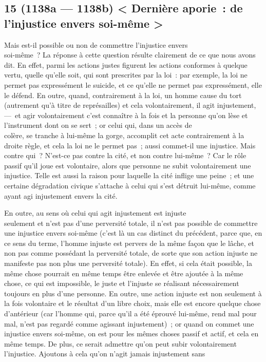 \documentclass[french,twoside]{book} %
\begin{document}
\subsection[{15 (1138a — 1138b) < Dernière aporie : de l’injustice envers soi-même >}]{15 (1138a — 1138b) < Dernière aporie : de l’injustice envers soi-même >}
\noindent Mais est-il possible ou non de commettre l’injustice envers \\
soi-même ? La réponse à cette question résulte clairement de ce que nous avons dit. En effet, parmi les actions justes figurent les actions conformes à quelque vertu, quelle qu’elle soit, qui sont prescrites par la loi : par exemple, la loi ne permet pas expressément le suicide, et ce qu’elle ne permet pas expressément, elle le défend. En outre, quand, contrairement à la loi, un homme cause du tort (autrement qu’à titre de représailles) et cela volontairement, il agit injustement, — et agir volontairement c’est connaître à la fois et la personne qu’on lèse et l’instrument dont on se sert ; or celui qui, dans un accès de \\
colère, se tranche à lui-même la gorge, accomplit cet acte contrairement à la droite règle, et cela la loi ne le permet pas ; aussi commet-il une injustice. Mais contre qui ? N’est-ce pas contre la cité, et non contre lui-même ? Car le rôle passif qu’il joue est volontaire, alors que personne ne subit volontairement une injustice. Telle est aussi la raison pour laquelle la cité inflige une peine ; et une certaine dégradation civique s’attache à celui qui s’est détruit lui-même, comme ayant agi injustement envers la cité.\par
En outre, au sens où celui qui agit injustement est injuste \\
seulement et n’est pas d’une perversité totale, il n’est pas possible de commettre une injustice envers soi-même (c’est là un cas distinct du précédent, parce que, en ce sens du terme, l’homme injuste est pervers de la même façon que le lâche, et non pas comme possédant la perversité totale, de sorte que son action injuste ne manifeste pas non plus une perversité totale). En effet, si cela était possible, la même chose pourrait en même temps être enlevée et être ajoutée à la même chose, ce qui est impossible, le juste et l’injuste se réalisant nécessairement \\
toujours en plus d’une personne. En outre, une action injuste est non seulement à la fois volontaire et le résultat d’un libre choix, mais elle est encore quelque chose d’antérieur (car l’homme qui, parce qu’il a été éprouvé lui-même, rend mal pour mal, n’est pas regardé comme agissant injustement) ; or quand on commet une injustice envers soi-même, on est pour les mêmes choses passif et actif, et cela en même temps. De plus, ce serait admettre qu’on peut subir volontairement l’injustice. Ajoutons à cela qu’on n’agit jamais injustement sans \\
\end{document}
